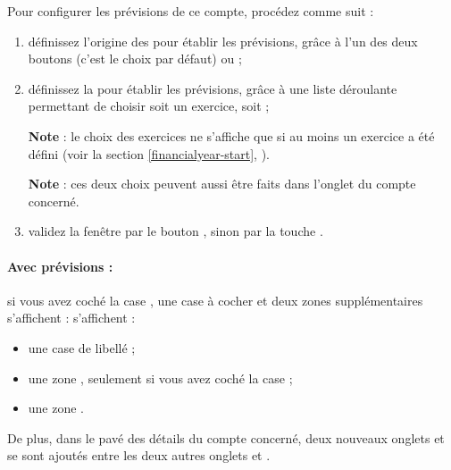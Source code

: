 Pour configurer les prévisions de ce compte, procédez comme suit :
\begin{enumerate}	
	\item définissez l'origine des  pour établir les prévisions, grâce à l'un des deux boutons  (c'est le choix par défaut) ou  ;
	\item définissez la  pour établir les prévisions, grâce à une liste déroulante permettant de choisir soit un exercice, soit  ; %
	
	\textbf{Note} : le choix des exercices ne s'affiche que si au moins un exercice a été défini (voir la section \vref{financialyear-start}, ).
	
	\textbf{Note} : ces deux choix peuvent aussi être faits dans l'onglet  du compte concerné.
	\item validez la fenêtre par le bouton , sinon par la touche .	
\end{enumerate}

\paragraph{Avec prévisions :}si vous avez coché la case , une case à cocher et deux zones supplémentaires \ifIllustration s'affichent :
\else s'affichent : 
\fi

\begin{itemize}
	\item une case de libellé  ; 
	\item une zone , seulement si vous avez coché la case  ; 
	\item une zone .
\end{itemize}

De plus, dans le pavé des détails du compte concerné, deux nouveaux onglets  et  se sont ajoutés entre les deux autres onglets  et .

